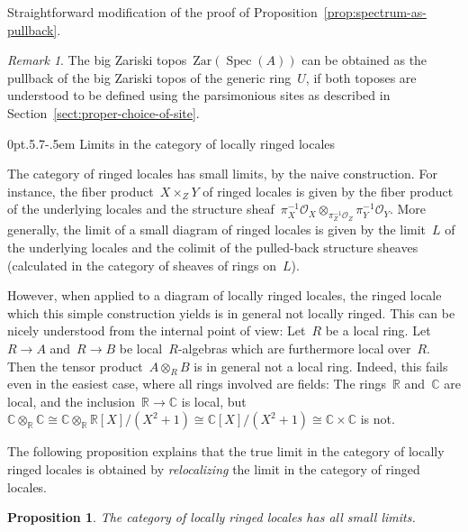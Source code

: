 \documentclass[10pt,reqno,a4paper]{amsbook}
\makeatletter
\theoremstyle{definition}
\theoremstyle{plain}
\newtheorem{prop}[defn]{Proposition}
\theoremstyle{remark}
\newtheorem{rem}[defn]{Remark}
\renewcommand{\O}{\mathcal{O}}
\newcommand{\RR}{\mathbb{R}}
\newcommand{\CC}{\mathbb{C}}
\newcommand{\Zar}{\mathrm{Zar}}
\DeclareMathOperator{\Spec}{Spec}
\newcommand{\?}{\,{:}\,}
\renewcommand{\_}{\mathpunct{.}\,}
\renewenvironment{proof}[1][\proofname]{\par
  \pushQED{\qed}%
  \normalfont \topsep6\p@\@plus6\p@\relax
  \trivlist
  \item[\hskip\labelsep
        \itshape
    #1\@addpunct{.}]\ignorespaces
}{%
  \popQED\endtrivlist\@endpefalse
}
\def\subsection{\@startsection{subsection}{2}%
  {0pt}{.5\linespacing\@plus.7\linespacing}{-.5em}%
  {\normalfont\bfseries}}
\makeatother
\begin{document}
\begin{proof}Straightforward modification of the proof of
Proposition~\ref{prop:spectrum-as-pullback}.
\end{proof}

\begin{rem}The big Zariski topos~$\Zar(\Spec(A))$ can be obtained as the
pullback of the big Zariski topos of the generic ring~$U$, if both toposes
are understood to be defined using the parsimonious sites as described in
Section~\ref{sect:proper-choice-of-site}.
\end{rem}


\subsection{Limits in the category of locally ringed locales}

The category of ringed locales has small limits, by the naive construction. For
instance, the fiber product~$X \times_Z Y$ of ringed locales is given by the
fiber product of the underlying locales and the
structure sheaf~$\pi_X^{-1}\O_X \otimes_{\pi_Z^{-1}\O_Z} \pi_Y^{-1}\O_Y$. More
generally, the limit of a small diagram of ringed locales is given by the limit~$L$
of the underlying locales and the colimit of the pulled-back structure sheaves
(calculated in the category of sheaves of rings on~$L$).

However, when applied to a diagram of locally ringed locales, the ringed locale
which this simple construction yields is in general not locally ringed. This
can be nicely understood from the internal point of view: Let~$R$ be a local
ring. Let~$R \to A$ and~$R \to B$ be local~$R$-algebras which are furthermore
local over~$R$. Then the tensor product~$A \otimes_R B$ is in general not a
local ring. Indeed, this fails even in the easiest case, where all rings
involved are fields: The rings~$\RR$ and~$\CC$ are local, and the
inclusion~$\RR \to \CC$ is local, but~$\CC \otimes_\RR \CC \cong \CC
\otimes_\RR \RR[X]/(X^2+1) \cong \CC[X]/(X^2+1) \cong \CC \times
\CC$ is not.

The following proposition explains that the true limit in the category of
locally ringed locales is obtained by \emph{relocalizing} the limit in the
category of ringed locales.

\begin{prop}\label{prop:lrl-complete}
The category of locally ringed locales has all small limits.
\end{prop}
\end{document}
